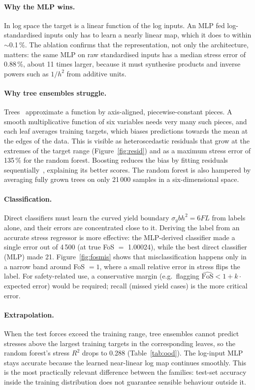 \documentclass[11pt,a4paper]{article}
\begin{document}
\paragraph{Why the MLP wins.} In log space the target is a linear function of the log inputs. An MLP fed
log-standardised inputs only has to learn a nearly linear map, which it does to within
$\sim$0.1\,\%. The ablation confirms that the representation, not only the architecture, matters: the same MLP on raw
standardised inputs has a median stress error of 0.88\,\%, about 11 times larger, because it must
synthesise products and inverse powers such as $1/h^2$ from additive units.

\paragraph{Why tree ensembles struggle.} Trees~\cite{hastie2009} approximate a function by axis-aligned, piecewise-constant pieces. A
smooth multiplicative function of six variables needs very many such pieces, and each leaf averages training targets,
which biases predictions towards the mean at the edges of the data. This is visible as heteroscedastic residuals that
grow at the extremes of the target range (Figure~\ref{fig:resid}) and as a maximum stress error of 135\,\% for the
random forest. Boosting reduces the bias by fitting residuals sequentially~\cite{friedman2001}, explaining its better scores.
The random forest is also hampered by averaging fully grown trees on only 21\,000 samples in a six-dimensional space.

\paragraph{Classification.} Direct classifiers must learn the curved yield boundary $\sigma_y b h^2=6FL$ from labels
alone, and their errors are concentrated close to it. Deriving the label from an accurate stress regressor is more
effective: the MLP-derived classifier made a single error out of 4\,500 (at true FoS $=$ 1.00024), while
the best direct classifier (MLP) made 21. Figure~\ref{fig:fosmis} shows that misclassification happens only in
a narrow band around FoS $=1$, where a small relative error in stress flips the label. For safety-related use, a
conservative margin (e.g.\ flagging $\widehat{\mathrm{FoS}}<1+k\cdot$ expected error) would be required; recall
(missed yield cases) is the more critical error.

\paragraph{Extrapolation.} When the test forces exceed the training range, tree ensembles cannot predict stresses above
the largest training targets in the corresponding leaves, so the random forest's stress $R^2$ drops to 0.288
(Table~\ref{tab:ood}). The log-input MLP stays accurate because the learned near-linear log map continues smoothly.
This is the most practically relevant difference between the families: test-set accuracy inside the training
distribution does not guarantee sensible behaviour outside it.
\end{document}

